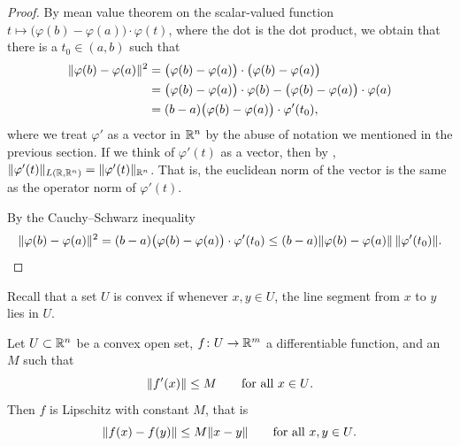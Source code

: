 \begin{proof}
By mean value theorem on the scalar-valued function
$t \mapsto \bigl(\varphi(b)-\varphi(a) \bigr) \cdot \varphi(t)$,
where the dot is the dot product, we obtain
that
there is a $t_0 \in (a,b)$ such that
\begin{equation*}
\begin{split}
\lVert {\varphi(b)-\varphi(a)} \rVert^2
& =
\bigl( \varphi(b)-\varphi(a) \bigr)
\cdot
\bigl( \varphi(b)-\varphi(a) \bigr)
\\
& =
\bigl(\varphi(b)-\varphi(a) \bigr) \cdot \varphi(b) - 
\bigl(\varphi(b)-\varphi(a) \bigr) \cdot \varphi(a)
\\
& = 
(b-a)
\bigl(\varphi(b)-\varphi(a) \bigr) \cdot \varphi'(t_0) ,
\end{split}
\end{equation*}
where we treat $\varphi'$ as a vector in ${\mathbb{R}}^n$ by the abuse of
notation we mentioned in the previous section.
If we think of $\varphi'(t)$ as a vector, then by
,
$\lVert {\varphi'(t)} \rVert_{L({\mathbb{R}},{\mathbb{R}}^n)} = \lVert {\varphi'(t)} \rVert_{{\mathbb{R}}^n}$.
That is, the euclidean norm of the vector is the same as the operator norm
of $\varphi'(t)$.

By the Cauchy--Schwarz inequality
\begin{equation*}
\lVert {\varphi(b)-\varphi(a)} \rVert^2
=
(b-a)\bigl(\varphi(b)-\varphi(a) \bigr) \cdot \varphi'(t_0)
\leq
(b-a)
\lVert {\varphi(b)-\varphi(a)} \rVert \, \lVert {\varphi'(t_0)} \rVert . \qedhere
\end{equation*}
\end{proof}

Recall that a set $U$ is convex
if whenever $x,y \in U$, the line segment from
$x$ to $y$ lies in $U$.

\begin{prop} \label{mv:prop:convexlip}
Let $U \subset {\mathbb{R}}^n$ be a convex open set, $f \colon U \to {\mathbb{R}}^m$
a differentiable function, and an $M$ such that
\begin{equation*}
\lVert {f'(x)} \rVert \leq M
\qquad \text{for all $x \in U$.}
\end{equation*}
Then $f$ is Lipschitz with constant $M$, that is
\begin{equation*}
\lVert {f(x)-f(y)} \rVert \leq M \lVert {x-y} \rVert
\qquad
\text{for all $x,y \in U$.}
\end{equation*}
\end{prop}

